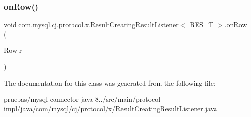 \mbox{\label{classcom_1_1mysql_1_1cj_1_1protocol_1_1x_1_1_result_creating_result_listener_a3b582384d167ddc242cffd7805de375c}} 
\subsubsection{\texorpdfstring{on\+Row()}{onRow()}}
{\footnotesize\ttfamily void \mbox{\hyperlink{classcom_1_1mysql_1_1cj_1_1protocol_1_1x_1_1_result_creating_result_listener}{com.\+mysql.\+cj.\+protocol.\+x.\+Result\+Creating\+Result\+Listener}}$<$ R\+E\+S\+\_\+T $>$.on\+Row (\begin{DoxyParamCaption}\item[{Row}]{r }\end{DoxyParamCaption})}



The documentation for this class was generated from the following file\+:\begin{DoxyCompactItemize}
\item 
pruebas/mysql-\/connector-\/java-\/8../src/main/protocol-\/impl/java/com/mysql/cj/protocol/x/\mbox{\hyperlink{_result_creating_result_listener_8java}{Result\+Creating\+Result\+Listener.\+java}}\end{DoxyCompactItemize}
